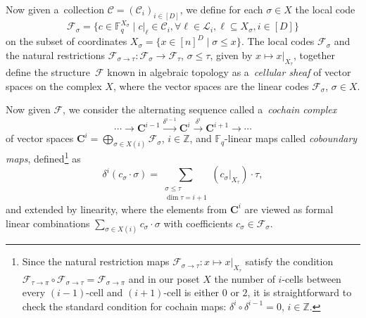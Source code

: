 \documentclass[conference]{IEEEtran}
\let\le\leqslant
\theoremstyle{plain}
\theoremstyle{definition}
\theoremstyle{remark}
\newcommand{\bC}{\mathbf{C}}
\newcommand{\cC}{\mathcal{C}}
\newcommand{\cF}{\mathcal{F}}
\newcommand{\cL}{\mathcal{L}}
\newcommand{\Z}{\mathbb{Z}}
\newcommand{\F}{\mathbb{F}}
\begin{document}
Now given a~collection $\cC=(\cC_i)_{i\in [D]}$, we define for each $\sigma \in X$ the local code
\[
\cF_\sigma  = \{c \in \F_q^{X_\sigma} \mid c|_\ell \in \cC_i, \forall \ell \in \cL_i, \ell \subseteq X_\sigma, i\in [D] \}
\] 
on the subset of coordinates 
$X_\sigma = \{x \in [n]^D \mid \sigma \le x \}$. 
The local codes $\cF_\sigma$ and the natural restrictions $\cF_{\sigma\to\tau}\colon \cF_\sigma \to \cF_\tau$, $\sigma \le \tau$, given by $x \mapsto x|_{X_\tau}$, together define the structure~$\cF$ known in algebraic topology as a~\emph{cellular sheaf} of vector spaces on the complex $X$, where the vector spaces are the linear codes $\cF_\sigma$, $\sigma \in X$. 

Now given $\cF$, we 
consider the alternating sequence called a~\emph{cochain complex}
\[
\cdots\rightarrow\bC^{i-1} \xrightarrow{\delta^{i-1}}  \bC^i \xrightarrow{\delta^{i}}  \bC^{i+1} \rightarrow \cdots 
\]
of vector spaces $\bC^i = \bigoplus_{\sigma\in X(i)} \cF_\sigma$, $i\in\Z$, and $\F_q$-linear maps  
called \emph{coboundary maps}, defined\footnote{Since the natural restriction maps $\cF_{\sigma\to\tau}\colon x\mapsto x|_{X_\tau}$ satisfy the condition 
$\cF_{\tau\to\pi} \circ \cF_{\sigma\to\tau} = \cF_{\sigma\to\pi}$
and in our poset $X$ the number of $i$-cells between every $(i-1)$-cell and $(i+1)$-cell is either $0$ or $2$, it is straightforward to check the standard condition for cochain maps: $\delta^{i}\circ\delta^{i-1} = 0$, $i\in \Z$.} as
\[
\delta^i (c_{\sigma}\cdot\sigma) = \sum_{\substack{\sigma \le \tau\\\dim \tau = i+1}} (c_{\sigma}|_{X_\tau})\cdot\tau, 
\]
and extended by linearity, where the elements from $\bC^i$ are viewed as formal linear combinations $\sum_{\sigma\in X(i)} c_\sigma\cdot \sigma$ with coefficients $c_\sigma \in \cF_\sigma$. 
\end{document}
